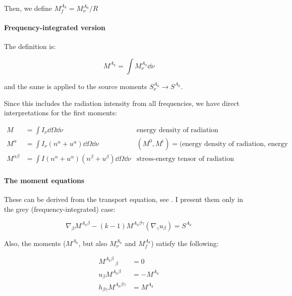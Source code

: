 \documentclass[main.tex]{subfiles}
\begin{document}
Then, we define \( M_f ^{A_k} =  M_{\nu} ^{A_k} / R\)

\paragraph{Frequency-integrated version}

The definition is:

\begin{equation}
   M ^{A_k} = \int   M^{A_k} _\nu \dd{\nu}
\end{equation}

and the same is applied to the source moments \(S_\nu^{A_k} \rightarrow S^{A_k}\).

Since this includes the radiation intensity from all frequencies, we have direct interpretations for the first moments:

\begin{subequations}
\begin{align}
   M &= \int  I_\nu \dd{\Omega} \dd{\nu}   & \text{energy density of radiation}  \\
   M^\alpha &= \int I_\nu (n^\alpha + u^\alpha)\dd{\Omega} \dd{\nu}   & (M^0, M^i) = \text{(energy density of radiation, energy flux)}  \\
   M^{\alpha\beta} &= \int I (n^\alpha + u^\alpha)(n^\beta + u^\beta)\dd{\Omega} \dd{\nu}   & \text{stress-energy tensor of radiation}
\end{align}
\end{subequations}

\paragraph{The moment equations}

These can be derived from the transport equation, see \cite[3.14]{Thorne:1981feb}. I present them only in the grey (frequency-integrated) case:

\begin{equation} \label{eq:grey-moment-equations}
  \nabla_\beta M^{A_k \beta} - (k-1) M^{A_k \beta \gamma} (\nabla_ \gamma u_\beta)= S^{A_k}
\end{equation}

Also, the moments (\(M^{A_k}\), but also \(M^{A_k}_\nu\) and \(M^{A_k}_f\)) satisfy the following:

\begin{subequations}
\begin{align}
  M^{A_k \beta}\,_\beta &= 0 \\
  u_\beta M^{A_k \beta} &= -M^{A_k} \\
  h_{\beta \gamma} M^{A_k \beta \gamma} &= M^{A_k}
\end{align}
\end{subequations}
\end{document}
